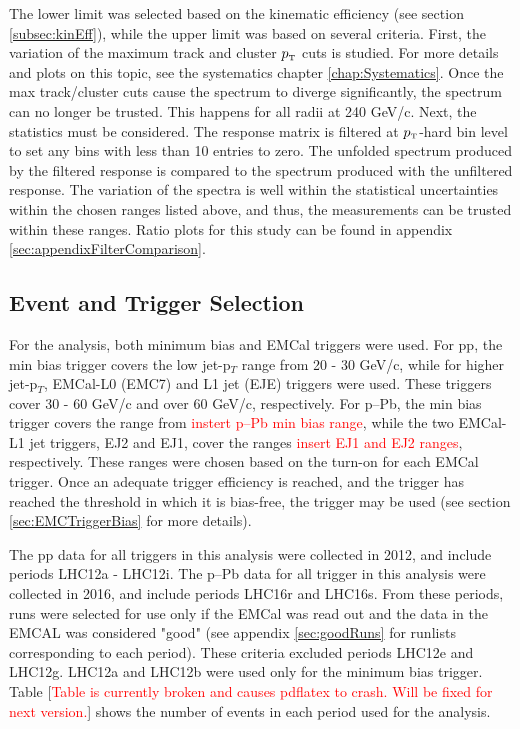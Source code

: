 \documentclass[ALICE]{ALICE_analysis_notes}
\newcommand{\pT}{$p_{\mbox{\tiny T}}$\xspace}
\newcommand{\pPb}{{\mbox{p--Pb}}\xspace}
\newcommand{\pp}{pp\xspace}
\begin{document}
The lower limit was selected based on the kinematic efficiency (see section \ref{subsec:kinEff}), while the upper limit was based on several criteria. First, the variation of the maximum track and cluster \pT cuts is studied. For more details and plots on this topic, see the systematics chapter \ref{chap:Systematics}. Once the max track/cluster cuts cause the spectrum to diverge significantly, the spectrum can no longer be trusted. This happens for all radii at 240 GeV/c. Next, the statistics must be considered. The response matrix is filtered at \pT-hard bin level to set any bins with less than 10 entries to zero. The unfolded spectrum produced by the filtered response is compared to the spectrum produced with the unfiltered response. The variation of the spectra is well within the statistical uncertainties within the chosen ranges listed above, and thus, the measurements can be trusted within these ranges. Ratio plots for this study can be found in appendix \ref{sec:appendixFilterComparison}.

\subsection{Event and Trigger Selection}
\label{sec:EvtTrgSel}

For the analysis, both minimum bias and EMCal triggers were used. For \pp, the min bias trigger covers the low jet-p$_T$ range from 20 - 30 GeV/c, while for higher jet-p$_T$, EMCal-L0 (EMC7) and L1 jet (EJE) triggers were used. These triggers cover 30 - 60 GeV/c and over 60 GeV/c, respectively. For \pPb, the min bias trigger covers the range from \textcolor{red}{instert \pPb min bias range}, while the two EMCal-L1 jet triggers, EJ2 and EJ1, cover the ranges \textcolor{red}{insert EJ1 and EJ2 ranges}, respectively.  These ranges were chosen based on the turn-on for each EMCal trigger. Once an adequate trigger efficiency is reached, and the trigger has reached the threshold in which it is bias-free, the trigger may be used (see section \ref{sec:EMCTriggerBias} for more details).

The \pp data for all triggers in this analysis were collected in 2012, and include periods LHC12a - LHC12i. The \pPb data for all trigger in this analysis were collected in 2016, and include periods LHC16r and LHC16s. From these periods, runs were selected for use only if the EMCal was read out and the data in the EMCAL was considered "good" (see appendix \ref{sec:goodRuns} for runlists corresponding to each period). These criteria excluded periods LHC12e and LHC12g. LHC12a and LHC12b were used only for the minimum bias trigger. Table [\textcolor{red}{Table is currently broken and causes pdflatex to crash. Will be fixed for next version.}] shows the number of events in each period used for the analysis.
\end{document}
